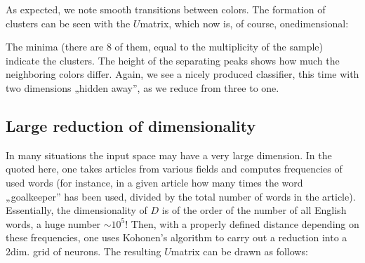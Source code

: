 \documentclass[a4paper,12pt,polish]{jupyterBook}
\begin{document}
\sphinxAtStartPar
As expected, we note smooth transitions between colors. The formation of clusters can be seen with the \(U\)\sphinxhyphen{}matrix, which now is, of course, one\sphinxhyphen{}dimensional:
\begin{sphinxVerbatimInput}

\begin{sphinxVerbatim}[commandchars=\\\{\}]

   
    \PYG{p}{[}\PYG{p}{]}\PYG{p}{[}\PYG{p}{]}\PYG{p}{[}\PYG{p}{]}\PYG{p}{[}\PYG{p}{]}\PYG{p}{[}\PYG{p}{]}
\end{sphinxVerbatim}
\end{sphinxVerbatimInput}
\begin{sphinxVerbatimOutput}

\noindent{}
\end{sphinxVerbatimOutput}

\sphinxAtStartPar
The minima (there are 8 of them, equal to the multiplicity of the sample) indicate the clusters. The height of the separating peaks shows how much the neighboring colors differ. Again, we see a nicely produced classifier, this time with two dimensions „hidden away”, as we reduce from three to one.


\subsection{Large reduction of dimensionality}
\label{\detokenize{docs/som:large-reduction-of-dimensionality}}
\sphinxAtStartPar
In many situations the input space may have a very large dimension. In the  quoted here, one takes articles from various fields and computes frequencies of used words (for instance, in a given article how  many times the word „goalkeeper” has been used, divided by the total number of words in the article). Essentially, the dimensionality of \(D\) is of the order of the number of all English words, a huge number \(\sim 10^5\)! Then, with a properly defined distance depending on these frequencies, one uses Kohonen’s algorithm to carry out a reduction into a 2\sphinxhyphen{}dim. grid of neurons. The resulting \(U\)\sphinxhyphen{}matrix can be drawn as follows:
\begin{sphinxVerbatimOutput}

\noindent{}
\end{sphinxVerbatimOutput}
\end{document}
